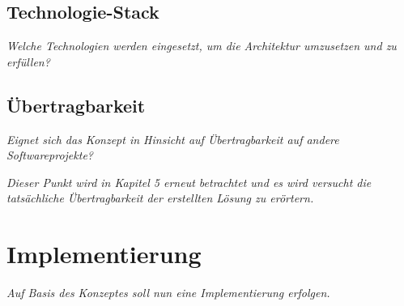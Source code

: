 	\subsection{Technologie-Stack}
	\label{sec:technologie-stack}

	\textit{Welche Technologien werden eingesetzt, um die Architektur umzusetzen und zu erfüllen?}

	\subsection{Übertragbarkeit}

	\textit{Eignet sich das Konzept in Hinsicht auf Übertragbarkeit auf andere Softwareprojekte?}

	\textit{Dieser Punkt wird in Kapitel 5 erneut betrachtet und es wird versucht die tatsächliche Übertragbarkeit der erstellten Lösung zu erörtern.}

\section{Implementierung}

	\textit{Auf Basis des Konzeptes soll nun eine Implementierung erfolgen.}